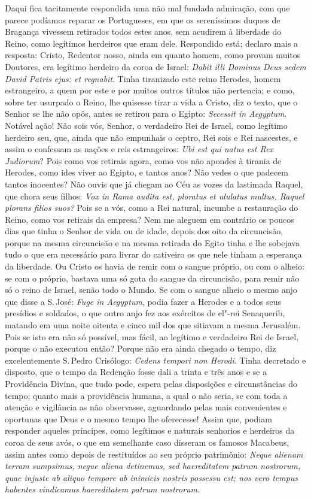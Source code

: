Daqui fica tacitamente respondida uma não mal fundada admiração, com que
parece podíamos reparar os Portugueses, em que os sereníssimos duques de
Bragança vivessem retirados todos estes anos, sem acudirem à liberdade
do Reino, como legítimos herdeiros que eram dele. Respondido está;
declaro mais a resposta: Cristo, Redentor nosso, ainda em quanto homem,
como provam muitos Doutores, era legítimo herdeiro da coroa de Israel:
\emph{Dabit illi Dominus Deus sedem David Patris ejus: et regnabit}.
Tinha tiranizado este reino Herodes, homem estrangeiro, a quem por este
e por muitos outros títulos não pertencia; e como, sobre ter usurpado o
Reino, lhe quisesse tirar a vida a Cristo, diz o texto, que o Senhor se
lhe não opôs, antes se retirou para o Egipto: \emph{Secessit in
Aegyptum}. Notável ação! Não sois vós, Senhor, o verdadeiro Rei de
Israel, como legítimo herdeiro seu, que, ainda que não empunhais o
ceptro, Rei sois e Rei nascestes, e assim o confessam as nações e reis
estrangeiros: \emph{Ubi est qui natus est Rex Judiorum}? Pois como vos
retirais agora, como vos não apondes à tirania de Herodes, como ides
viver ao Egipto, e tantos anos? Não vedes o que padecem tantos
inocentes? Não ouvis que já chegam ao Céu as vozes da lastimada Raquel,
que chora seus filhos: \emph{Vox in Rama audita est, ploratus et
ululatus multus, Raquel plorans filios suos?} Pois se a vós, como a Rei
natural, incumbe a restauração do Reino, como vos retirais da empresa?
Nem me aleguem em contrário os poucos dias que tinha o Senhor de vida ou de
idade, depois dos oito da circuncisão, porque na mesma circuncisão e na
mesma retirada do Egito tinha e lhe sobejava tudo o que era necessário
para livrar do cativeiro os que nele tinham a esperança da liberdade. Ou
Cristo os havia de remir com o sangue próprio, ou com o alheio: se com o
próprio, bastava uma só gota do sangue da circuncisão, para remir não só
o reino de Israel, senão todo o Mundo. Se com o sangue alheio o mesmo
anjo que disse a S.\,José: \emph{Fuge in Aegyptum}, podia fazer a Herodes
e a todos seus presídios e soldados, o que outro anjo fez aos exércitos
de el"-rei Senaquerib, matando em uma noite oitenta e cinco mil dos que
sitiavam a mesma Jerusalém. Pois se isto era não só possível, mas fácil,
ao legítimo e verdadeiro Rei de Israel, porque o não executou então?
Porque não era ainda chegado o tempo, diz excelentemente S.\,Pedro
Crisólogo: \emph{Cedens tempori non Herodi}. Tinha decretado e disposto,
que o tempo da Redenção fosse dali a trinta e três anos e se a
Providência Divina, que tudo pode, espera pelas disposições e
circunstâncias do tempo; quanto mais a providência humana, a qual o não
seria, se com toda a atenção e vigilância as não observasse, aguardando
pelas mais convenientes e oportunas que Deus e o mesmo tempo lhe
oferecesse! Assim que, podiam responder aqueles príncipes, como
legítimos e naturais senhorios e herdeiros da coroa de seus avós, o que
em semelhante caso disseram os famosos Macabeus, assim antes como depois
de restituídos ao seu próprio patrimônio: \emph{Neque alienam terram
sumpsimus, negue aliena detinemus, sed haereditatem patrum nostrorum,
quae injuste ab aliquo tempore ab inimicis nostris possessu est; nos
vero tempus habentes vindicamus haereditatem patrum nostrorum}.

